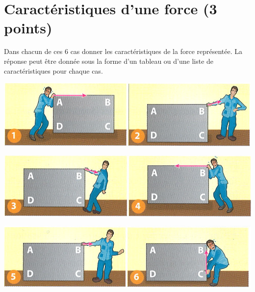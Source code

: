 \section{Caractéristiques d'une force (3 points)}\label{force}

Dans chacun de ces 6 cas donner les caractéristiques de la force représentée. %
La réponse peut être donnée sous la forme d'un tableau ou d'une liste de caractéristiques pour chaque cas.

\begin{center}
	\includegraphics[scale=0.5]{forces_1}
	
	\vspace*{0.5cm}
	
	\includegraphics[scale=0.5]{forces_2}

	\vspace*{0.5cm}
	
	\includegraphics[scale=0.5]{forces3}
\end{center}
